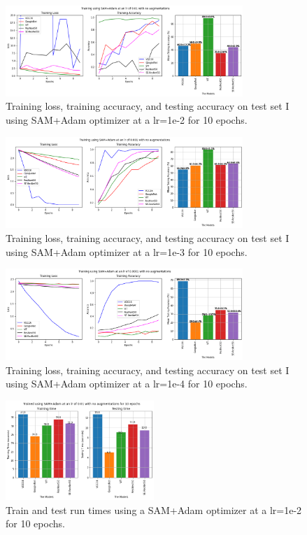 \documentclass[a4paper,11pt]{article}
\begin{document}
\begin{figure}[h!]
    \centering
    \includegraphics[width=0.8\textwidth]{Best_soln_for_challenge2.png}
    \caption{Training loss, training accuracy, and testing accuracy on test set I using SAM+Adam optimizer at a lr=1e-2 for 10 epochs.}
    \label{fig:Training_curves_ch2best}
\end{figure}
\begin{figure}[h!]
    \centering
    \includegraphics[width=0.8\textwidth]{SAM+Adam_lr0.001.png}
    \caption{Training loss, training accuracy, and testing accuracy on test set I using SAM+Adam optimizer at a lr=1e-3 for 10 epochs.}
    \label{fig:Training_curves_ch2_e-3}
\end{figure}
\begin{figure}[h!]
    \centering
    \includegraphics[width=0.8\textwidth]{SAM+Adam_lr0.0001.png}
    \caption{Training loss, training accuracy, and testing accuracy on test set I using SAM+Adam optimizer at a lr=1e-4 for 10 epochs.}
    \label{fig:Training_curves_ch2_e-4}
\end{figure}
\clearpage
\begin{figure}[t!]
    \centering
    \includegraphics[width=0.5\textwidth]{best_soln_time.png}
    \caption{Train and test run times using a SAM+Adam optimizer at a lr=1e-2 for 10 epochs.}
    \label{fig:Training_curves_ch2_best_time}
\end{figure}
\end{document}
